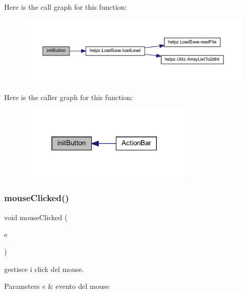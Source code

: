 Here is the call graph for this function\+:\nopagebreak
\begin{figure}[H]
\begin{center}
\leavevmode
\includegraphics[width=350pt]{classui_1_1_action_bar_aed9fe7e919d4355a7ad86701d44e1fea_cgraph}
\end{center}
\end{figure}
Here is the caller graph for this function\+:\nopagebreak
\begin{figure}[H]
\begin{center}
\leavevmode
\includegraphics[width=233pt]{classui_1_1_action_bar_aed9fe7e919d4355a7ad86701d44e1fea_icgraph}
\end{center}
\end{figure}
\mbox{\label{classui_1_1_action_bar_a45d56bd84238e8b56589dfc732e2b2cf}} 
\subsubsection{\texorpdfstring{mouse\+Clicked()}{mouseClicked()}}
{\footnotesize\ttfamily void mouse\+Clicked (\begin{DoxyParamCaption}\item[{Mouse\+Event}]{e }\end{DoxyParamCaption})}



gestisce i click del mouse. 


\begin{DoxyParams}{Parameters}
{\em e} & evento del mouse \\
\hline
\end{DoxyParams}


